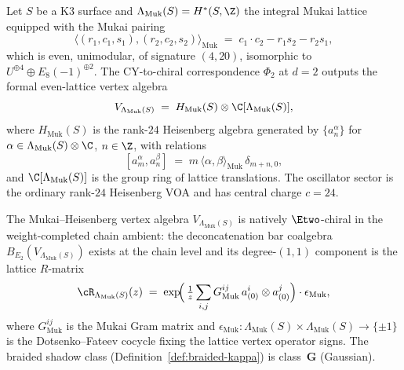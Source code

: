 \begin{construction}
\label{constr:mukai-heisenberg}
Let $S$ be a K3 surface and $\Lambda_{\mathrm{Muk}}(S) = H^*(S, \Z)$
the integral Mukai lattice equipped with the Mukai pairing
\[
 \langle (r_1, c_1, s_1), (r_2, c_2, s_2) \rangle_{\mathrm{Muk}}
 \;=\; c_1 \cdot c_2 - r_1 s_2 - r_2 s_1,
\]
which is even, unimodular, of signature $(4, 20)$, isomorphic to
$U^{\oplus 4} \oplus E_8(-1)^{\oplus 2}$. The CY-to-chiral correspondence
$\Phi_2$ at $d = 2$ outputs the formal even-lattice vertex algebra
\[
 V_{\Lambda_{\mathrm{Muk}}(S)}
 \;=\; H_{\mathrm{Muk}}(S) \otimes \C[\Lambda_{\mathrm{Muk}}(S)],
\]
where $H_{\mathrm{Muk}}(S)$ is the rank-$24$ Heisenberg algebra
generated by $\{a^\alpha_n\}$ for $\alpha \in \Lambda_{\mathrm{Muk}}(S)
\otimes \C$, $n \in \Z$, with relations
\[
 [a^\alpha_m, a^\beta_n]
 \;=\; m \, \langle \alpha, \beta \rangle_{\mathrm{Muk}} \, \delta_{m+n, 0},
\]
and $\C[\Lambda_{\mathrm{Muk}}(S)]$ is the group ring of lattice
translations. The oscillator sector is the ordinary rank-$24$ Heisenberg
VOA and has central charge $c = 24$.
\end{construction}

\begin{proposition}
\label{prop:mukai-heisenberg-e2}
The Mukai--Heisenberg vertex algebra $V_{\Lambda_{\mathrm{Muk}}(S)}$ is
natively $\Etwo$-chiral in the weight-completed chain ambient: the deconcatenation bar coalgebra
$B_{E_2}(V_{\Lambda_{\mathrm{Muk}}(S)})$ exists at the chain level and
its degree-$(1,1)$ component is the lattice $R$-matrix
\[
 \cR_{\Lambda_{\mathrm{Muk}}(S)}(z)
 \;=\; \exp\!\Bigl(\, \tfrac{1}{z} \sum_{i, j} G^{ij}_{\mathrm{Muk}} \, a^i_{(0)} \otimes a^j_{(0)} \Bigr) \cdot \epsilon_{\mathrm{Muk}},
\]
where $G^{ij}_{\mathrm{Muk}}$ is the Mukai Gram matrix and
$\epsilon_{\mathrm{Muk}} \colon \Lambda_{\mathrm{Muk}}(S) \times
\Lambda_{\mathrm{Muk}}(S) \to \{\pm 1\}$ is the Dotsenko--Fateev cocycle
fixing the lattice vertex operator signs. The braided shadow class
(Definition~\ref{def:braided-kappa}) is class~$\mathbf{G}$ (Gaussian).
\end{proposition}

